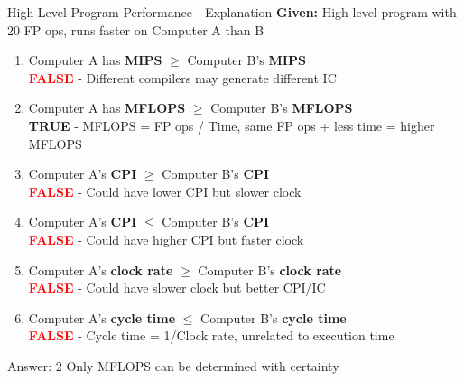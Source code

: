 \documentclass[aspectratio=169,12pt]{beamer}
\begin{document}
\begin{frame}{High-Level Program Performance - Explanation}
\scriptsize
\textbf{Given:} High-level program with 20 FP ops, runs faster on Computer A than B

\begin{enumerate}
    \item Computer A has \textbf{MIPS} $\geq$ Computer B's \textbf{MIPS}\\
    \pause
    \hspace{1em}\colorbox{red!20}{\textcolor{red}{\textbf{FALSE}}} - Different compilers may generate different IC
    \pause

    \item Computer A has \textbf{MFLOPS} $\geq$ Computer B's \textbf{MFLOPS}\\
    \pause
    \hspace{1em}\colorbox{green!20}{\textcolor{green!50!black}{\textbf{TRUE}}} - MFLOPS = FP ops / Time, same FP ops + less time = higher MFLOPS
    \pause

    \item Computer A's \textbf{CPI} $\geq$ Computer B's \textbf{CPI}\\
    \pause
    \hspace{1em}\colorbox{red!20}{\textcolor{red}{\textbf{FALSE}}} - Could have lower CPI but slower clock
    \pause

    \item Computer A's \textbf{CPI} $\leq$ Computer B's \textbf{CPI}\\
    \pause
    \hspace{1em}\colorbox{red!20}{\textcolor{red}{\textbf{FALSE}}} - Could have higher CPI but faster clock
    \pause

    \item Computer A's \textbf{clock rate} $\geq$ Computer B's \textbf{clock rate}\\
    \pause
    \hspace{1em}\colorbox{red!20}{\textcolor{red}{\textbf{FALSE}}} - Could have slower clock but better CPI/IC
    \pause

    \item Computer A's \textbf{cycle time} $\leq$ Computer B's \textbf{cycle time}\\
    \pause
    \hspace{1em}\colorbox{red!20}{\textcolor{red}{\textbf{FALSE}}} - Cycle time = 1/Clock rate, unrelated to execution time
\end{enumerate}

\pause
\begin{alertblock}{Answer: 2}
Only MFLOPS can be determined with certainty
\end{alertblock}
\end{frame}
\end{document}
